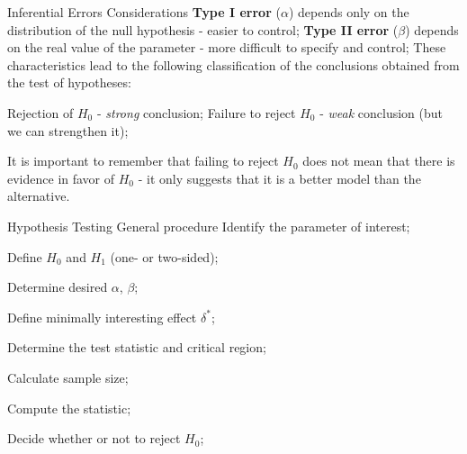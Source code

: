 \documentclass[t]{beamer}
\begin{document}

\begin{ftst}
{Inferential Errors}
{Considerations}
\textbf{Type I error} ($\alpha$) depends only on the distribution of the null hypothesis - easier to control;
\vone
\textbf{Type II error} ($\beta$) depends on the real value of the parameter - more difficult to specify and control;
\vone
These characteristics lead to the following classification of the conclusions obtained from the test of hypotheses:
\begin{block}{}
\bitems Rejection of $H_0$ - \textit{strong} conclusion; 
\spitem Failure to reject $H_0$ - \textit{weak} conclusion (but we can strengthen it);
\eitem
\end{block}
\vone
It is important to remember that failing to reject $H_0$ does not mean that there is evidence in favor of $H_0$ - it only suggests that it is a better model than the alternative.
\end{ftst}


\begin{ftst}
{Hypothesis Testing}
{General procedure}
\bitems Identify the parameter of interest;
	\item Define $H_0$ and $H_1$ (one- or two-sided);
	\item Determine desired $\alpha$, $\beta$;
	\item Define minimally interesting effect $\delta^*$;
	\item Determine the test statistic and critical region;
	\item Calculate sample size;
	\item Compute the statistic;
	\item Decide whether or not to reject $H_0$;
\eitem

\end{ftst}

\end{document}
